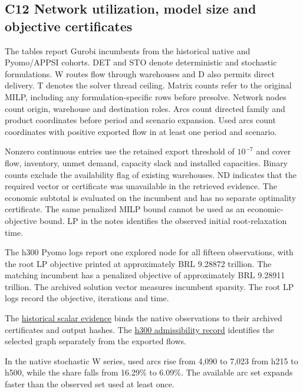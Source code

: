 \documentclass[
  english,
  11pt,
  a4paper,
]{article}
\begin{document}
\subsection{C12 Network utilization, model size and objective
certificates}\label{c12-network-utilization-model-size-and-objective-certificates}

The tables report Gurobi incumbents from the historical native and
Pyomo/APPSI cohorts. DET and STO denote deterministic and stochastic
formulations. W routes flow through warehouses and D also permits direct
delivery. T denotes the solver thread ceiling. Matrix counts refer to
the original MILP, including any formulation-specific rows before
presolve. Network nodes count origin, warehouse and destination roles.
Arcs count directed family and product coordinates before period and
scenario expansion. Used arcs count coordinates with positive exported
flow in at least one period and scenario.

Nonzero continuous entries use the retained export threshold of
\(10^{-7}\) and cover flow, inventory, unmet demand, capacity slack and
installed capacities. Binary counts exclude the availability flag of
existing warehouses. ND indicates that the required vector or
certificate was unavailable in the retrieved evidence. The economic
subtotal is evaluated on the incumbent and has no separate optimality
certificate. The same penalized MILP bound cannot be used as an
economic-objective bound. LP in the notes identifies the observed
initial root-relaxation time.

The h300 Pyomo logs report one explored node for all fifteen
observations, with the root LP objective printed at approximately BRL
9.28872 trillion. The matching incumbent has a penalized objective of
approximately BRL 9.28911 trillion. The archived solution vector
measures incumbent sparsity. The root LP logs record the objective,
iterations and time.

The
\href{https://github.com/unb-lamfo-or-ai-hpc/model-agrologistic/blob/f8ee519b45477c593930692e71601cf1f406896e/manuscript/scalar_evidence.json}{historical
scalar evidence} binds the native observations to their archived
certificates and output hashes. The
\href{https://github.com/unb-lamfo-or-ai-hpc/model-agrologistic/blob/0f63c10eb1abf88318a4d9c6afc75fcac97f6266/docs/evidence/h300_selected_graph_release_20261101.json}{h300
admissibility record} identifies the selected graph separately from the
exported flows.

In the native stochastic W series, used arcs rise from 4,090 to 7,023
from h215 to h500, while the share falls from 16.29\% to 6.09\%. The
available arc set expands faster than the observed set used at least
once.
\end{document}

